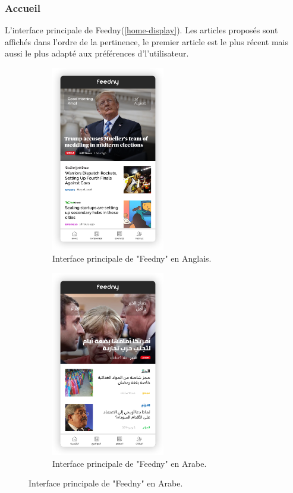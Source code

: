     \subsubsection{Accueil}
    L'interface principale de \textquotedbl Feedny\textquotedbl (\autoref{home-display}). Les articles proposés sont affichés dans l'ordre de la pertinence, le premier article est le plus récent mais aussi le plus adapté aux préférences d'l'utilisateur.
        \begin{figure}[H]
           \begin{minipage}{0.48\textwidth}
             \begin{figure}[H]
                \centering
                \includegraphics[width=140pt]{img/chapter4/feedny/en-home.png}
                \caption{Interface principale de "Feedny" en Anglais.}
                \label{home-display}
            \end{figure}
           \end{minipage}\hfill
           \begin {minipage}{0.48\textwidth}
             \begin{figure}[H]
                \centering
                \includegraphics[width=140pt]{img/chapter4/feedny/ar-home.png}
                \caption{Interface principale de "Feedny" en Arabe.}
                \label{}
            \end{figure}
           \end{minipage}
        \end{figure}

